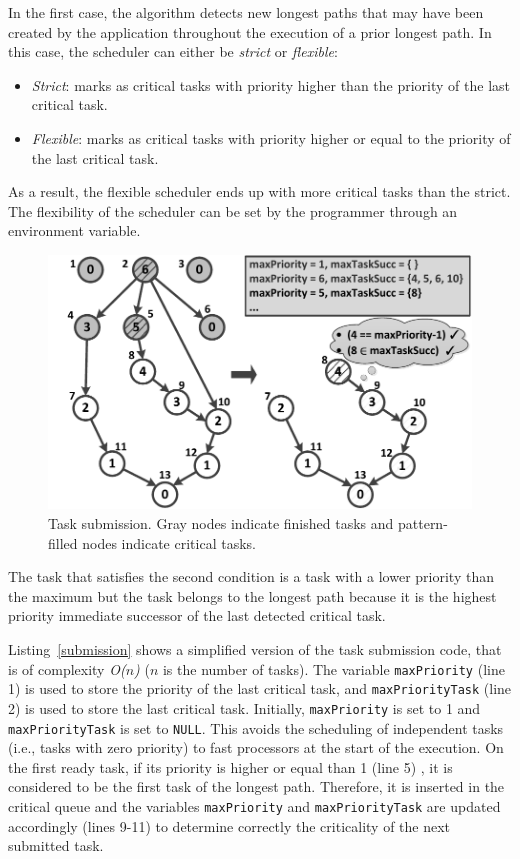 In the first case, the algorithm detects new longest paths that may have been created by the application throughout the execution of a prior longest path. In this case, the scheduler can either be \textit{strict} or \textit{flexible}:
\begin{itemize}
 \item{\textit{Strict}: marks as critical tasks with priority higher than the priority of the last critical task.}
 \item{\textit{Flexible}: marks as critical tasks with priority higher or equal to the priority of the last critical task.} 
 \end{itemize}
As a result, the flexible scheduler ends up with more critical tasks than the strict. The flexibility of the scheduler can be set by the programmer through an environment variable.
\fi %
\begin{figure}[tl!]
\includegraphics[width=\columnwidth]{images/fig_2.pdf} 
\centering
\caption{Task submission. Gray nodes indicate finished tasks and pattern-filled nodes indicate critical tasks.}
\label{submitFig}
\vspace{-0.5cm}
\end{figure}
The task that satisfies the second condition is a task with a lower priority than the maximum but the task belongs to the longest path because it is the highest priority immediate successor of the last detected critical task. 

Listing~\ref{submission} shows a simplified version of the task submission code, that is of complexity \textit{O($n$)} (\textit{$n$} is the number of tasks). The variable \texttt{maxPriority} (line 1) is used to store the priority of the last critical task, and \texttt{maxPriorityTask} (line 2) is used to store the last critical task. Initially, \texttt{maxPriority} is set to 1 and \texttt{maxPriorityTask} is set to \texttt{NULL}. This avoids the scheduling of independent tasks (i.e., tasks with zero priority) to fast processors at the start of the execution. On the first ready task, if its priority is higher or equal than 1 (line 5) , it is considered to be the first task of the longest path. Therefore, it is inserted in the critical queue and the variables \texttt{maxPriority} and \texttt{maxPriorityTask} are updated accordingly (lines 9-11) to determine correctly the criticality of the next submitted task.

